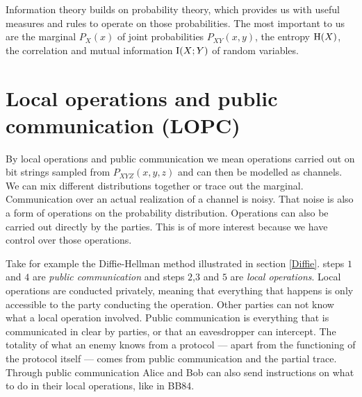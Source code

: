     
    Information theory builds on probability theory, which provides us with useful measures and rules to operate on those probabilities.
    The most important to us are the marginal $P_X(x)$ of joint probabilities $P_{XY}(x,y)$, the entropy $\operatorname{H} (X)$, the correlation and mutual information $\operatorname{I}(X;Y)$ of random variables.
    
    
    
    
\section{Local operations and public communication (LOPC)}
    By local operations and public communication we mean operations carried out on bit strings sampled from $P_{XYZ}(x,y,z)$ and can then be modelled as channels.
    We can mix different distributions together or trace out the marginal.
    Communication over an actual realization of a channel is noisy. 
    That noise is also a form of operations on the probability distribution.
    Operations can also be carried out directly by the parties.
    This is of more interest because we have control over those operations.
    
    Take for example the Diffie-Hellman method illustrated in section \ref{Diffie}.
    steps $1$ and $4$ are \emph{public communication} and steps $2$,$3$ and $5$ are \emph{local operations}.
    Local operations are conducted privately, meaning that everything that happens is only accessible to the party conducting the operation.
    Other parties can not know what a local operation involved.
    Public communication is everything that is communicated in clear by parties, or that an eavesdropper can intercept.
    The totality of what an enemy knows from a protocol --- apart from the functioning of the protocol itself --- comes from public communication and the partial trace.
    Through public communication Alice and Bob can also send instructions on what to do in their local operations, like in BB84.
    
